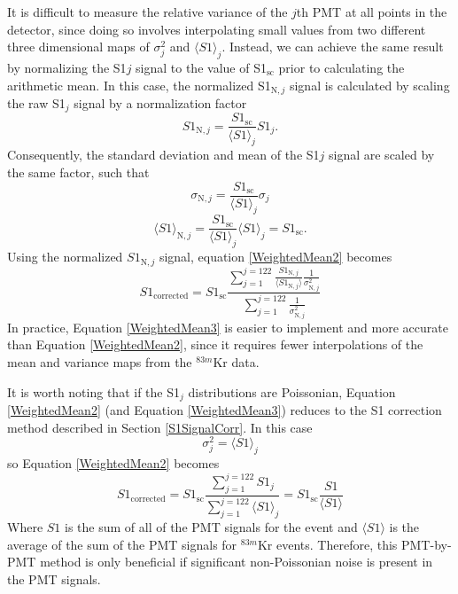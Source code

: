 \documentclass[a4paper,12pt]{article}
\begin{document}
{It is difficult to measure the relative variance of the $j$th PMT at all points in the detector, since doing so involves interpolating small values from two different three dimensional maps of  $\sigma_j^2$ and $\langle S1 \rangle_{j}$.  Instead, we can achieve the same result by normalizing the S1$j$ signal to the value of S1$_{\mbox{sc}}$ prior to calculating the arithmetic mean.  In this case, the normalized S1$_{\text{N},j}$ signal is calculated by scaling the raw S1$_j$ signal by a normalization factor
\begin{equation}
S1_{\text{N},j}=\frac{S1_{\mbox{sc}}}{\langle S1 \rangle_{j}} S1_j.
\end{equation}
Consequently, the standard deviation and mean of the S1$j$ signal are scaled by the same factor, such that
\begin{equation}
\sigma_{\text{N},j} = \frac{S1_{\mbox{sc}}}{\langle S1 \rangle_{j}} \sigma_j
\end{equation}
\begin{equation}
\langle S1 \rangle_{\text{N},j} = \frac{S1_{\mbox{sc}}}{\langle S1 \rangle_{j}} \langle S1 \rangle_{j} = S1_{\mbox{sc}}.
\end{equation}
Using the normalized $S1_{\text{N},j}$ signal, equation \ref{WeightedMean2} becomes
\begin{equation} \label{WeightedMean3}
S1_{\mbox{corrected}} = S1_{\mbox{sc}} \frac{\sum_{j=1}^{j=122} \frac{S1_{\text{N},j}}{\langle S1_{\text{N},j} \rangle}\frac{1}{ \sigma_{\text{N},j}^2}}{ \sum_{j=1}^{j=122} \frac{1}{\sigma_{\text{N},j}^2}}
\end{equation}
In practice, Equation \ref{WeightedMean3} is easier to implement and more accurate than Equation \ref{WeightedMean2}, since it requires fewer interpolations of the mean and variance maps from the $^{83m}$Kr data.

It is worth noting that if the S1$_j$ distributions are Poissonian, Equation \ref{WeightedMean2} (and Equation \ref{WeightedMean3}) reduces to the S1 correction method described in Section \ref{S1SignalCorr}.  In this case 
\begin{equation}
\sigma_{j}^2 = \langle S1 \rangle_{j}
\end{equation}
so Equation \ref{WeightedMean2} becomes
\begin{equation}
S1_{\mbox{corrected}} = S1_{\mbox{sc}} \frac{\sum_{j=1}^{j=122} S1_j}{\sum_{j=1}^{j=122} \langle S1 \rangle_{j}} = S1_{\mbox{sc}} \frac{S1}{\langle S1 \rangle}
\end{equation}
Where $S1$ is the sum of all of the PMT signals for the event and $\langle S1 \rangle$ is the average of the sum of the PMT signals for $^{83m}$Kr events. Therefore, this PMT-by-PMT method is only beneficial if significant non-Poissonian noise is present in the PMT signals.

}
\end{document}
